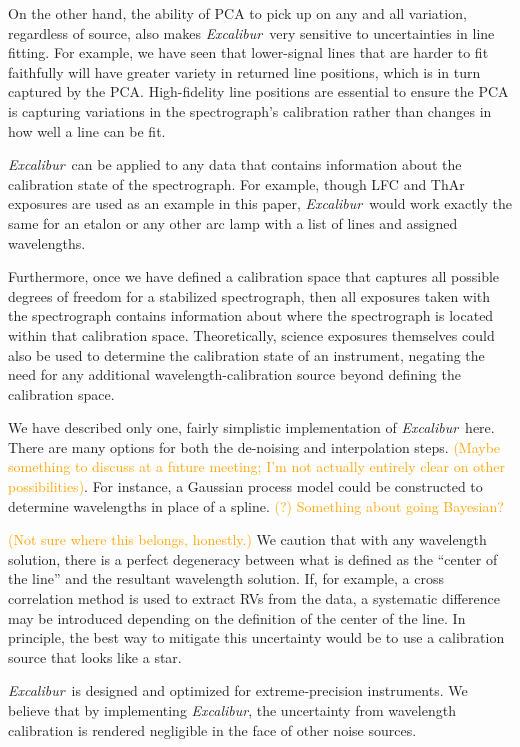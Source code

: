 \documentclass[12pt, onecolumn]{aastex63}
\newcommand{\lz}[1]{\textcolor{orange}{#1}}
\newcommand{\project}[1]{\textsl{#1}}
\newcommand{\name}{\project{Excalibur}}
\begin{document}
On the other hand, the ability of PCA to pick up on any and all variation, regardless of source, also makes \name\ very sensitive to uncertainties in line fitting.  For example, we have seen that lower-signal lines that are harder to fit faithfully will have greater variety in returned line positions, which is in turn captured by the PCA.  High-fidelity line positions are essential to ensure the PCA is capturing variations in the spectrograph's calibration rather than changes in how well a line can be fit.

\name\ can be applied to any data that contains information about the calibration state of the spectrograph.  For example, though LFC and ThAr exposures are used as an example in this paper, \name\ would work exactly the same for an etalon or any other arc lamp with a list of lines and assigned wavelengths.

Furthermore, once we have defined a calibration space that captures all possible degrees of freedom for a stabilized spectrograph, then all exposures taken with the spectrograph contains information about where the spectrograph is located within that calibration space.  Theoretically, science exposures themselves could also be used to determine the calibration state of an instrument, negating the need for any additional wavelength-calibration source beyond defining the calibration space.

We have described only one, fairly simplistic implementation of \name\ here.  There are many options for both the de-noising and interpolation steps.  \lz{(Maybe something to discuss at a future meeting; I'm not actually entirely clear on other possibilities)}.  For instance, a Gaussian process model could be constructed to determine wavelengths in place of a spline. \lz{(?)}  \lz{Something about going Bayesian?}

\lz{(Not sure where this belongs, honestly.)}  We caution that with any wavelength solution, there is a perfect degeneracy between what is defined as the ``center of the line'' and the resultant wavelength solution.  If, for example, a cross correlation method is used to extract RVs from the data, a systematic difference may be introduced depending on the definition of the center of the line.  In principle, the best way to mitigate this uncertainty would be to use a calibration source that looks like a star.

\name\ is designed and optimized for extreme-precision instruments.  We believe that by implementing \name, the uncertainty from wavelength calibration is rendered negligible in the face of other noise sources.





\end{document}
